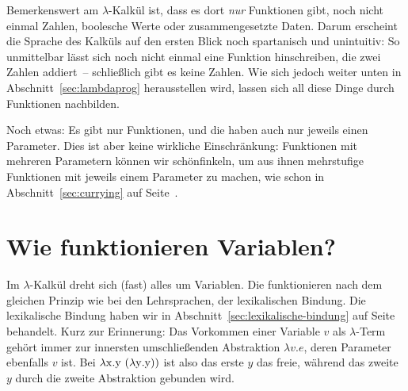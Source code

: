 Bemerkenswert am $\lambda$-Kalkül ist, dass es dort \emph{nur}
Funktionen gibt, noch nicht einmal Zahlen, boolesche Werte oder
zusammengesetzte Daten.  Darum erscheint die Sprache des Kalküls auf den
ersten Blick noch spartanisch und unintuitiv: So unmittelbar lässt sich
noch nicht einmal eine Funktion hinschreiben, die zwei Zahlen addiert~--
schließlich gibt es keine Zahlen.  Wie sich jedoch weiter unten in
Abschnitt~\ref{sec:lambdaprog} herausstellen wird, lassen sich all diese
Dinge durch Funktionen nachbilden.

Noch etwas: Es gibt nur Funktionen, und die haben auch nur jeweils
einen Parameter.  Dies ist aber keine wirkliche Einschränkung:
Funktionen mit mehreren Parametern können wir
schönfinkeln, um aus ihnen mehrstufige
Funktionen mit jeweils einem Parameter zu machen, wie schon in
Abschnitt~\ref{sec:currying} auf Seite~\pageref{sec:currying}.

\section{Wie funktionieren Variablen?}

Im $\lambda$-Kalkül dreht sich (fast) alles um Variablen.  Die
funktionieren nach dem gleichen Prinzip wie bei den Lehrsprachen, der
lexikalischen Bindung.  Die lexikalische Bindung haben wir in
Abschnitt~\ref{sec:lexikalische-bindung} auf
Seite~\pageref{sec:lexikalische-bindung} behandelt.  Kurz zur
Erinnerung:  Das
Vorkommen einer Variable $v$ als $\lambda$-Term gehört immer zur
innersten umschließenden Abstraktion $\lambda v.e$, deren Parameter
ebenfalls $v$ ist.  Bei $\lambda \mathrm x.\mathrm y~(\lambda \mathrm y.\mathrm y))$ 
ist also das erste $y$ das freie, während das zweite $y$ durch
die zweite Abstraktion gebunden wird.

